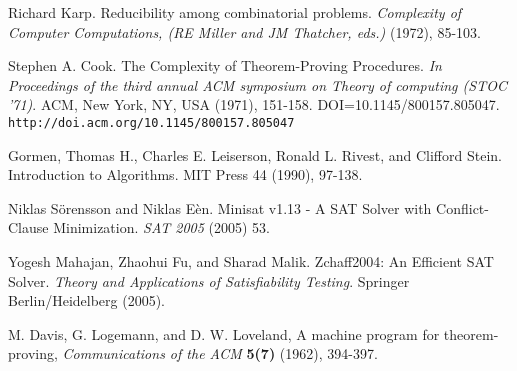 \documentclass[paper=a4, fontsize=11pt]{scrartcl} %
\begin{document}
\begin{thebibliography}{9}

 Richard Karp. Reducibility among combinatorial problems. \emph{Complexity of Computer Computations, (RE Miller and JM Thatcher, eds.)} (1972), 85-103.

 Stephen A. Cook. The Complexity of Theorem-Proving Procedures. \emph{In Proceedings of the third annual ACM symposium on Theory of computing (STOC '71)}. ACM, New York, NY, USA (1971), 151-158. DOI=10.1145/800157.805047. {\tt http://doi.acm.org/10.1145/800157.805047}

 Gormen, Thomas H., Charles E. Leiserson, Ronald L. Rivest, and Clifford Stein. Introduction to Algorithms. MIT Press 44 (1990), 97-138.

 Niklas S\"{o}rensson and Niklas E\`{e}n. Minisat v1.13 - A SAT Solver with Conflict-Clause Minimization. \emph{SAT 2005} (2005) 53.

 Yogesh Mahajan, Zhaohui Fu, and Sharad Malik. Zchaff2004: An Efficient SAT Solver. \emph{Theory and Applications of Satisfiability Testing}. Springer Berlin/Heidelberg (2005).

 M. Davis, G. Logemann, and D. W. Loveland, A machine program for theorem-proving, \emph{Communications of the ACM} \textbf{5(7)} (1962), 394-397.

\end{thebibliography}
\end{document}
